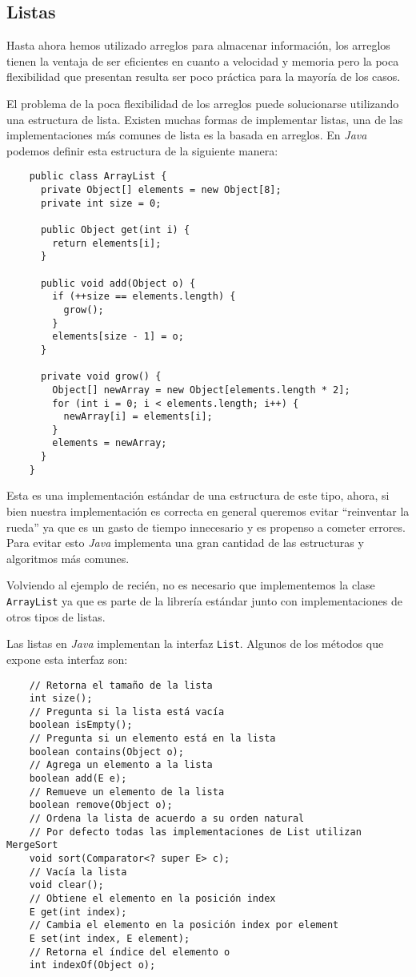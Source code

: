 \subsection{Listas}
  Hasta ahora hemos utilizado arreglos para almacenar información, los arreglos tienen la ventaja
  de ser eficientes en cuanto a velocidad y memoria pero la poca flexibilidad que presentan 
  resulta ser poco práctica para la mayoría de los casos.

  El problema de la poca flexibilidad de los arreglos puede solucionarse utilizando una estructura
  de lista.
  Existen muchas formas de implementar listas, una de las implementaciones más comunes de lista es
  la basada en arreglos.
  En \textit{Java} podemos definir esta estructura de la siguiente manera:

  \begin{verbatim}
    public class ArrayList {
      private Object[] elements = new Object[8];
      private int size = 0;

      public Object get(int i) {
        return elements[i];
      }

      public void add(Object o) {
        if (++size == elements.length) {
          grow();
        }
        elements[size - 1] = o;
      }

      private void grow() {
        Object[] newArray = new Object[elements.length * 2];
        for (int i = 0; i < elements.length; i++) {
          newArray[i] = elements[i];
        }
        elements = newArray;
      }
    }
  \end{verbatim}

  Esta es una implementación estándar de una estructura de este tipo, ahora, si bien nuestra 
  implementación es correcta en general queremos evitar \enquote{reinventar la rueda} ya que es un
  gasto de tiempo innecesario y es propenso a cometer errores.
  Para evitar esto \textit{Java} implementa una gran cantidad de las estructuras y algoritmos más
  comunes.

  Volviendo al ejemplo de recién, no es necesario que implementemos la clase \texttt{ArrayList} ya
  que es parte de la librería estándar junto con implementaciones de otros tipos de listas.
  
  Las listas en \textit{Java} implementan la interfaz \texttt{List}.
  Algunos de los métodos que expone esta interfaz son:
  \begin{verbatim}
    // Retorna el tamaño de la lista
    int size();
    // Pregunta si la lista está vacía
    boolean isEmpty();
    // Pregunta si un elemento está en la lista
    boolean contains(Object o); 
    // Agrega un elemento a la lista
    boolean add(E e);
    // Remueve un elemento de la lista
    boolean remove(Object o);
    // Ordena la lista de acuerdo a su orden natural
    // Por defecto todas las implementaciones de List utilizan MergeSort
    void sort(Comparator<? super E> c);
    // Vacía la lista
    void clear();
    // Obtiene el elemento en la posición index
    E get(int index);
    // Cambia el elemento en la posición index por element
    E set(int index, E element);
    // Retorna el índice del elemento o
    int indexOf(Object o);
  \end{verbatim}

